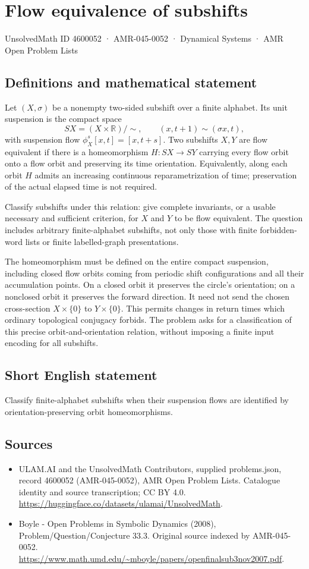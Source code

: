 \documentclass[11pt,a4paper]{article}
\begin{document}
\section*{Flow equivalence of subshifts}\label{4600052}
{\small UnsolvedMath ID 4600052 · AMR-045-0052 · Dynamical Systems · AMR Open Problem Lists}
\subsection{Definitions and mathematical statement}
Let $(X,\sigma)$ be a nonempty two-sided subshift over a
finite alphabet. Its unit suspension is the compact space
\[
 SX=(X\times\mathbb R)/\!\sim,\qquad
        (x,t+1)\sim(\sigma x,t),
\]
with suspension flow $\phi_X^s[x,t]=[x,t+s]$.
Two subshifts $X,Y$ are flow equivalent if there is a
homeomorphism $H:SX\to SY$ carrying every flow orbit
onto a flow orbit and preserving its time orientation.
Equivalently, along each orbit $H$ admits an increasing
continuous reparametrization of time; preservation of the
actual elapsed time is not required.

Classify subshifts under this relation: give complete
invariants, or a usable necessary and sufficient criterion,
for $X$ and $Y$ to be flow equivalent. The question
includes arbitrary finite-alphabet subshifts, not only those
with finite forbidden-word lists or finite labelled-graph
presentations.

The homeomorphism must be defined on the entire compact
suspension, including closed flow orbits coming from periodic
shift configurations and all their accumulation points.
On a closed orbit it preserves the circle's orientation;
on a nonclosed orbit it preserves the forward direction.
It need not send the chosen cross-section $X\times\{0\}$
to $Y\times\{0\}$. This permits changes in return times
which ordinary topological conjugacy forbids. The problem
asks for a classification of this precise orbit-and-orientation
relation, without imposing a finite input encoding for
all subshifts.
\subsection{Short English statement}
Classify finite-alphabet subshifts when their suspension flows are identified by orientation-preserving orbit homeomorphisms.
\subsection{Sources}
\begin{itemize}
\item[S1] ULAM.AI and the UnsolvedMath Contributors, supplied problems.json, record 4600052 (AMR-045-0052), AMR Open Problem Lists. Catalogue identity and source transcription; CC BY 4.0.
\url{https://huggingface.co/datasets/ulamai/UnsolvedMath}.
\item[S2] Boyle - Open Problems in Symbolic Dynamics (2008), Problem/Question/Conjecture 33.3. Original source indexed by AMR-045-0052.
\url{https://www.math.umd.edu/~mboyle/papers/openfinalsub3nov2007.pdf}.
\end{itemize}
\end{document}

